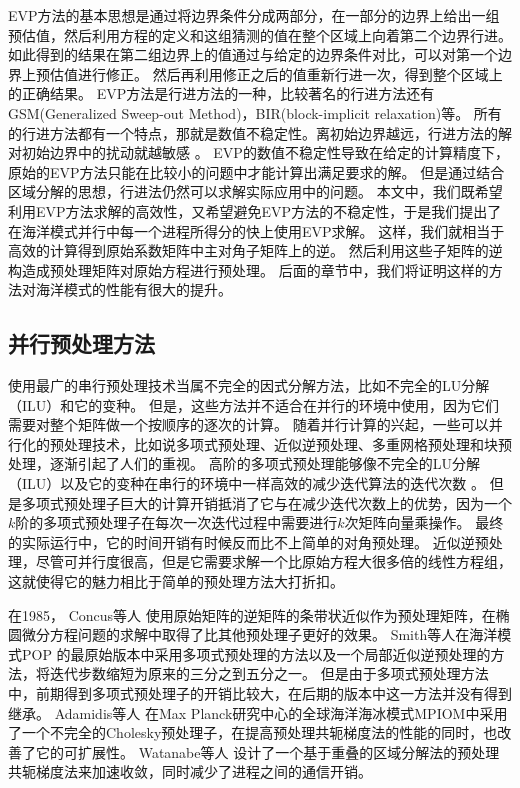 EVP方法的基本思想是通过将边界条件分成两部分，在一部分的边界上给出一组预估值，然后利用方程的定义和这组猜测的值在整个区域上向着第二个边界行进。
如此得到的结果在第二组边界上的值通过与给定的边界条件对比，可以对第一个边界上预估值进行修正。 然后再利用修正之后的值重新行进一次，得到整个区域上的正确结果\cite{roache1995elliptic}。 
EVP方法是行进方法的一种，比较著名的行进方法还有GSM(Generalized Sweep-out Method)\cite{hirota1970direct}，BIR(block-implicit relaxation)\cite{dietrich1975optimized}等。
所有的行进方法都有一个特点，那就是数值不稳定性。离初始边界越远，行进方法的解对初始边界中的扰动就越敏感 \cite{roache1995elliptic}。
EVP的数值不稳定性导致在给定的计算精度下，原始的EVP方法只能在比较小的问题中才能计算出满足要求的解。 
但是通过结合区域分解的思想，行进法仍然可以求解实际应用中的问题。 
本文中，我们既希望利用EVP方法求解的高效性，又希望避免EVP方法的不稳定性，于是我们提出了在海洋模式并行中每一个进程所得分的快上使用EVP求解。 
这样，我们就相当于高效的计算得到原始系数矩阵中主对角子矩阵上的逆。 然后利用这些子矩阵的逆构造成预处理矩阵对原始方程进行预处理。 
后面的章节中，我们将证明这样的方法对海洋模式的性能有很大的提升。 





\subsection{并行预处理方法}
\label{related:parall}

使用最广的串行预处理技术当属不完全的因式分解方法，比如不完全的LU分解（ILU）和它的变种\cite{benzi2002preconditioning}。 
但是，这些方法并不适合在并行的环境中使用，因为它们需要对整个矩阵做一个按顺序的逐次的计算。 
随着并行计算的兴起，一些可以并行化的预处理技术，比如说多项式预处理、近似逆预处理、多重网格预处理和块预处理，逐渐引起了人们的重视。 
高阶的多项式预处理能够像不完全的LU分解（ILU）以及它的变种在串行的环境中一样高效的减少迭代算法的迭代次数\cite{benzi2002preconditioning} 。 
但是多项式预处理子巨大的计算开销抵消了它与在减少迭代次数上的优势，因为一个$k$阶的多项式预处理子在每次一次迭代过程中需要进行$k$次矩阵向量乘操作。 
最终的实际运行中，它的时间开销有时候反而比不上简单的对角预处理\cite{meyer1989numerical,smith1992parallel}。
近似逆预处理，尽管可并行度很高，但是它需要求解一个比原始方程大很多倍的线性方程组\cite{smith1992parallel,bergamaschi2007numerical}， 这就使得它的魅力相比于简单的预处理方法大打折扣。

在1985， Concus等人 \cite{concus1985block} 使用原始矩阵的逆矩阵的条带状近似作为预处理矩阵，在椭圆微分方程问题的求解中取得了比其他预处理子更好的效果。 
Smith等人\cite{smith1992parallel}在海洋模式POP 的最原始版本中采用多项式预处理的方法以及一个局部近似逆预处理的方法，将迭代步数缩短为原来的三分之到五分之一。
但是由于多项式预处理方法中，前期得到多项式预处理子的开销比较大，在后期的版本中这一方法并没有得到继承。  
Adamidis等人 \cite{adamidis2011high} 在Max Planck研究中心的全球海洋海冰模式MPIOM中采用了一个不完全的Cholesky预处理子，在提高预处理共轭梯度法的性能的同时，也改善了它的可扩展性。 
Watanabe等人\cite{Watanabe2006pcg} 设计了一个基于重叠的区域分解法的预处理共轭梯度法来加速收敛，同时减少了进程之间的通信开销。 
 
